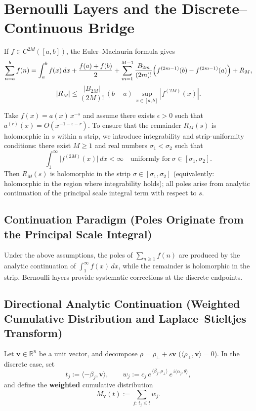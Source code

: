 \documentclass[11pt,a4paper]{article}
\theoremstyle{remark}
\begin{document}
\section{Bernoulli Layers and the Discrete--Continuous Bridge}

If $f\in C^{2M}([a,b])$, the Euler--Maclaurin formula gives
\begin{equation}
\sum_{n=a}^{b} f(n)
=\int_a^b f(x)\,dx+\frac{f(a)+f(b)}{2}
+\sum_{m=1}^{M-1}\frac{B_{2m}}{(2m)!}\Bigl(f^{(2m-1)}(b)-f^{(2m-1)}(a)\Bigr)+R_M,
\end{equation}
\begin{equation}
|R_M|\le \frac{|B_{2M}|}{(2M)!}\,(b-a)\,\sup_{x\in[a,b]}|f^{(2M)}(x)|.
\end{equation}

Take $f(x)=a(x)\,x^{-s}$ and assume there exists $\epsilon>0$ such that $a^{(r)}(x)=O(x^{-1-\epsilon-r})$. To ensure that the remainder $R_M(s)$ is holomorphic in $s$ within a strip, we introduce integrability and strip-uniformity conditions: there exist $M\ge1$ and real numbers $\sigma_1<\sigma_2$ such that
\begin{equation}
\int_{1}^{\infty}\bigl|f^{(2M)}(x)\bigr|\,dx<\infty
\quad\text{uniformly for}\ \sigma\in[\sigma_1,\sigma_2].
\end{equation}
Then $R_M(s)$ is holomorphic in the strip $\sigma\in[\sigma_1,\sigma_2]$ (equivalently: holomorphic in the region where integrability holds); all poles arise from analytic continuation of the principal scale integral term with respect to $s$.

\subsection{Continuation Paradigm (Poles Originate from the Principal Scale Integral)}

Under the above assumptions, the poles of $\sum_{n\ge1} f(n)$ are produced by the analytic continuation of $\int_1^\infty f(x)\,dx$, while the remainder is holomorphic in the strip. Bernoulli layers provide systematic corrections at the discrete endpoints.

\subsection{Directional Analytic Continuation (Weighted Cumulative Distribution and Laplace--Stieltjes Transform)}

Let $\mathbf v\in\mathbb{R}^n$ be a unit vector, and decompose $\rho=\rho_\perp+s\mathbf v$ ($\langle\rho_\perp,\mathbf v\rangle=0$). In the discrete case, set
\begin{equation}
t_j:=\langle-\beta_j,\mathbf v\rangle,\qquad
w_j:=c_j\,e^{\,\langle\beta_j,\rho_\perp\rangle}\,e^{\,i\langle\alpha_j,\theta\rangle},
\end{equation}
and define the \textbf{weighted} cumulative distribution
\begin{equation}
M_{\mathbf v}(t):=\sum_{j:\ t_j\le t} w_j .
\end{equation}
\end{document}
